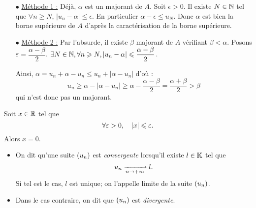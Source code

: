 \documentclass{magnolia}
\begin{document}

\begin{sol}
\begin{itemize}
\item[$\bullet$] \underline{Méthode 1 :} Déjà, $\alpha$ est un majorant de $A$. Soit $\epsilon>0$. Il existe $N\in \mathbb{N}$ tel que $\forall n\geq N$, $|u_n-\alpha|\leq \epsilon$. En particulier $\alpha-\epsilon \leq u_N$. Donc $\alpha$ est bien la borne supérieure de $A$ d'après la caractérisation de la borne supérieure.
\item[$\bullet$] \underline{Méthode 2 :} Par l'absurde, il existe $\beta$ majorant de $A$ vérifiant $\beta<\alpha$. Posons $\varepsilon=\dfrac{\alpha-\beta}{2}$. $\exists N \in \mathbb{N}, \forall n\geqslant N, |u_n-\alpha|\leqslant \dfrac{\alpha-\beta}{2}$.

Ainsi, $\alpha=u_n+\alpha-u_n\leq u_n+|\alpha-u_n|$ d'où :
\[u_n\geq \alpha-|\alpha-u_n|\geq \alpha-\dfrac{\alpha-\beta}{2}=\dfrac{\alpha+\beta}{2}>\beta\] qui n'est donc pas un majorant.
\end{itemize}
\end{sol}

\begin{laurence}
\begin{proposition}
Soit $x\in\mathbb{R}$ tel que
\[\forall \varepsilon>0,\quad \left|x\right|\leqslant\varepsilon.\]
Alors $x=0$.
\end{proposition}
\end{laurence}

\begin{definition}[utile=-3]
\begin{itemize}
\item On dit qu'une suite $\left(u_n\right)$ est \emph{convergente} lorsqu'il existe $l\in\mathbb{K}$
  tel que
  \[u_n\xrightarrow[n\rightarrow +\infty]{} l.\]
  Si tel est le cas, $l$ est unique; on l'appelle limite de la suite $\left(u_n\right)$.
\item Dans le cas contraire, on dit que $\left(u_n\right)$ est \emph{divergente}.
\end{itemize}
\end{definition}
\end{document}

